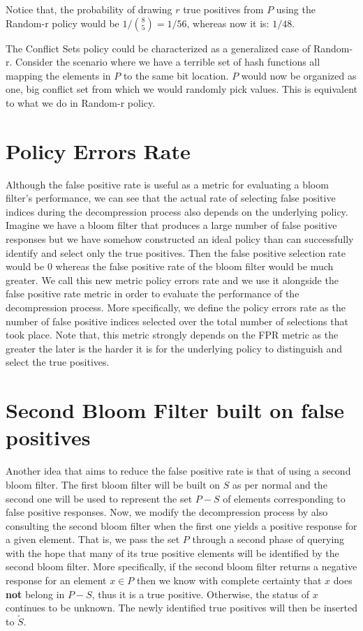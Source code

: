                 Notice that, the probability of drawing $r$ true positives from $P$ using the Random-r policy would be $1/\binom{8}{5} = 1/56$, whereas now it is:
                $1/48$.
                
                The Conflict Sets policy could be characterized as a generalized case of Random-r. 
                Consider the scenario where we have a terrible set of hash functions all mapping the elements in $P$ to the same bit location. $P$ would now be organized as one, big conflict set from which we would randomly pick values. 
                This is equivalent to what we do in Random-r policy.

    \section{Policy Errors Rate}
        Although the false positive rate is useful as a metric for evaluating a bloom filter's performance, we can see that the actual rate of selecting false positive indices during the decompression process also depends on the underlying policy.
        Imagine we have a bloom filter that produces a large number of false positive responses but we have somehow constructed an ideal policy than can successfully identify and select only the true positives.
        Then the false positive selection rate would be $0$ whereas the false positive rate of the bloom filter would be much greater.
        We call this new metric policy errors rate and we use it alongside the false positive rate metric in order to evaluate the performance of the decompression process.
        More specifically, we define the policy errors rate as the number of false positive indices selected over the total number of selections that took place.
        Note that, this metric strongly depends on the FPR metric as the greater the later is the harder it is for the underlying policy to distinguish and select the true positives.

    \section{Second Bloom Filter built on false positives}
        Another idea that aims to reduce the false positive rate is that of using a second bloom filter. 
        The first bloom filter will be built on $S$ as per normal and the second one will be used to represent the set $P-S$ of elements corresponding to false positive responses. 
        Now, we modify the decompression process by also consulting the second bloom filter when the first one yields a positive response for a given element.
        That is, we pass the set $P$ through a second phase of querying with the hope that many of its true positive elements will be identified by the second bloom filter.
        More specifically, if the second bloom filter returns a negative response for an element $x \in P$ then we know with complete certainty that $x$ does {\bf not} belong in $P-S$, thus it is a true positive.
        Otherwise, the status of $x$ continues to be unknown.
        The newly identified true positives will then be inserted to $\tilde{S}$.
        
